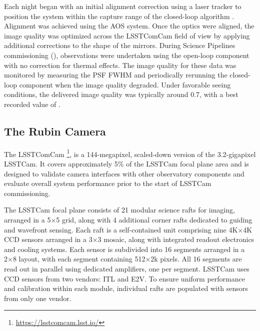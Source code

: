 Each night began with an initial alignment correction using a laser tracker to position the system within the capture range of the closed-loop \gls{algorithm} \citep{10.1117/12.3019031}.
Alignment was achieved using the \gls{AOS} system.
Once the optics were aligned, the image quality was optimized across the \gls{LSSTComCam} field of view by applying additional corrections to the shape of the mirrors.
During \gls{Science Pipelines} commissioning (), observations were undertaken using the open-loop component with no correction for thermal effects.
The image quality for these data was monitored by measuring the \gls{PSF} \gls{FWHM} and periodically rerunning the closed-loop component when the image quality degraded.
Under favorable \gls{seeing} conditions, the delivered image quality was typically around {0.7\arcsec\xspace}, with a best
recorded value of \bestimagequality.

\subsection{The Rubin Camera
\label{ssec:comcam}}
The \gls{LSSTComCam} \footnote{\url{https://lsstcomcam.lsst.io/}}, is a 144-megapixel, scaled-down version of the 3.2-gigapixel \gls{LSSTCam}.
It covers approximately 5\% of the \gls{LSSTCam} focal plane area and is designed to validate camera interfaces with other observatory components and evaluate overall system performance prior to the start of \gls{LSSTCam} commissioning.

The \gls{LSSTCam} focal plane consists of 21 modular science rafts for imaging, arranged in a 5×5 grid, along with 4 additional corner rafts dedicated to guiding and wavefront sensing.
Each raft is a self-contained unit comprising nine 4K×4K \gls{CCD} sensors arranged in a 3×3 mosaic, along with integrated readout electronics and cooling systems.
Each sensor is subdivided into 16 segments arranged in a 2×8 layout, with each segment containing 512×2k pixels.
All 16 segments are read out in parallel using dedicated amplifiers, one per segment.
\gls{LSSTCam} uses \gls{CCD} sensors from two vendors: \gls{ITL} and \gls{E2V}.
To ensure uniform performance and \gls{calibration} within each module, individual rafts are populated with sensors from only one vendor.


